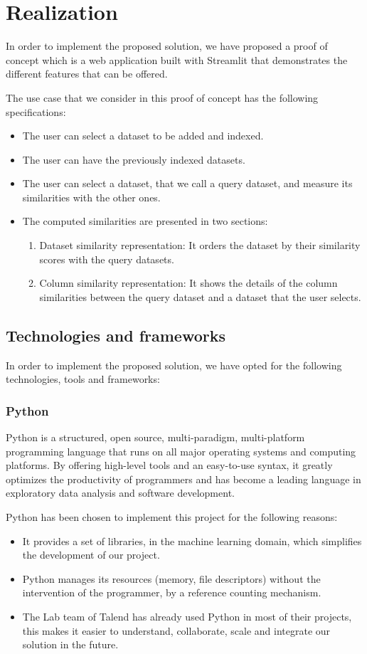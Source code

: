 \chapter{Realization}
In order to implement the proposed solution, we have proposed a proof of concept
which is a web application built with Streamlit that demonstrates the different
features that can be offered.

The use case that we consider in this proof of concept has the following specifications:
\begin{itemize}
    \item The user can select a dataset to be added and indexed.
    \item The user can have the previously indexed datasets.
    \item The user can select a dataset, that we call a query dataset, and measure
    its similarities with the other ones.
    \item The computed similarities are presented in two sections:
    \begin{enumerate}
        \item Dataset similarity representation: It orders the dataset by their
        similarity scores with the query datasets.
        \item Column similarity representation: It shows the details of the
        column similarities between the query dataset and a dataset that the
        user selects.
    \end{enumerate}
\end{itemize}


\section{Technologies and frameworks}
In order to implement the proposed solution, we have opted for the following
technologies, tools and frameworks:
\subsection{Python}
Python is a structured, open source, multi-paradigm, multi-platform programming
language that runs on all major operating systems and computing platforms. By
offering high-level tools and an easy-to-use syntax, it greatly optimizes the
productivity of programmers and has become a leading language in exploratory
data analysis and software development.

Python has been chosen to implement this project for the following reasons:
\begin{itemize}
    \item It provides a set of libraries, in the machine learning domain, which
    simplifies the development of our project.
    \item Python manages its resources (memory, file descriptors) without the
    intervention of the programmer, by a reference counting mechanism.
    \item The Lab team of Talend has already used Python in most of their
    projects, this makes it easier to understand, collaborate, scale and
    integrate our solution in the future.
\end{itemize}

